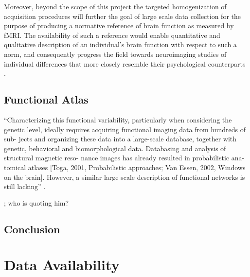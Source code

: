 
%
Moreover, beyond the scope of this project the targeted homogenization of
acquisition procedures will further the goal of large scale data collection for
the purpose of producing a normative reference of brain function as measured by
fMRI.
%
The availability of such a reference would enable quantitative and qualitative
description of an individual's brain function with respect to such a norm, and
consequently progress the field towards neuroimaging studies of individual
differences that more closely resemble their psychological counterparts
\citep{dubois2016building}.

\subsection{Functional Atlas}

``Characterizing this functional variability, particularly when considering the
genetic level, ideally requires acquiring functional imaging data from hundreds
of sub- jects and organizing these data into a large-scale database, together
with genetic, behavioral and biomorphological data. Databasing and analysis of
structural magnetic reso- nance images has already resulted in probabilistic
ana- tomical atlases [Toga, 2001, Probabilistic approaches; Van Essen, 2002,
Windows on the brain]. However, a similar large scale description of
functional networks is still lacking'' \citep{pinel2007fast}.

\citep{bazeille2019local}; who is quoting him?



\subsection{Conclusion}


\section{Data Availability}



